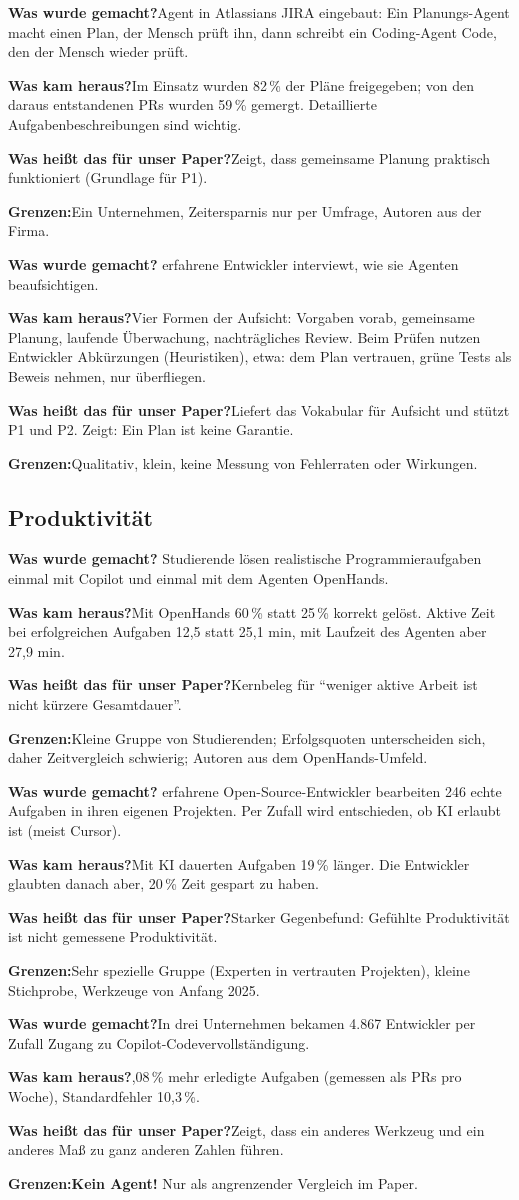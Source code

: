 \documentclass[11pt,a4paper,parskip=half]{scrartcl}
\newcommand{\studie}[6]{%
\begin{tcolorbox}[colback=white,colframe=akzent!50,arc=2pt,boxrule=0.6pt,
  title={\textbf{#1}\hfill\small #2},fonttitle=\color{white},colbacktitle=akzent!80]
\textbf{Was wurde gemacht?}\enskip #3\par
\textbf{Was kam heraus?}\enskip #4\par
\textbf{Was heißt das für unser Paper?}\enskip #5\par
\textbf{Grenzen:}\enskip #6
\end{tcolorbox}}
\begin{document}
\studie{Takerngsaksiri et al. (2025): HULA}{ICSE-SEIP, Atlassian}
{Agent in Atlassians JIRA eingebaut: Ein Planungs-Agent macht einen Plan, der Mensch prüft ihn, dann schreibt ein Coding-Agent Code, den der Mensch wieder prüft.}
{Im Einsatz wurden 82\,\% der Pläne freigegeben; von den daraus entstandenen PRs wurden 59\,\% gemergt. Detaillierte Aufgabenbeschreibungen sind wichtig.}
{Zeigt, dass gemeinsame Planung praktisch funktioniert (Grundlage für P1).}
{Ein Unternehmen, Zeitersparnis nur per Umfrage, Autoren aus der Firma.}

\studie{Dhanorkar et al. (2026): Aufsicht in der Praxis}{arXiv-Preprint, Microsoft}
{17 erfahrene Entwickler interviewt, wie sie Agenten beaufsichtigen.}
{Vier Formen der Aufsicht: Vorgaben vorab, gemeinsame Planung, laufende Überwachung, nachträgliches Review. Beim Prüfen nutzen Entwickler Abkürzungen (Heuristiken), etwa: dem Plan vertrauen, grüne Tests als Beweis nehmen, nur überfliegen.}
{Liefert das Vokabular für Aufsicht und stützt P1 und P2. Zeigt: Ein Plan ist keine Garantie.}
{Qualitativ, klein, keine Messung von Fehlerraten oder Wirkungen.}

\subsection{Produktivität}
\studie{Chen et al. (2026): \enquote{Code with me or for me?}}{CHI '26}
{20 Studierende lösen realistische Programmieraufgaben einmal mit Copilot und einmal mit dem Agenten OpenHands.}
{Mit OpenHands 60\,\% statt 25\,\% korrekt gelöst. Aktive Zeit bei erfolgreichen Aufgaben 12,5 statt 25,1 min, mit Laufzeit des Agenten aber 27,9 min.}
{Kernbeleg für \enquote{weniger aktive Arbeit ist nicht kürzere Gesamtdauer}.}
{Kleine Gruppe von Studierenden; Erfolgsquoten unterscheiden sich, daher Zeitvergleich schwierig; Autoren aus dem OpenHands-Umfeld.}

\studie{Becker et al. (2025): METR-Studie}{arXiv-Preprint}
{16 erfahrene Open-Source-Entwickler bearbeiten 246 echte Aufgaben in ihren eigenen Projekten. Per Zufall wird entschieden, ob KI erlaubt ist (meist Cursor).}
{Mit KI dauerten Aufgaben 19\,\% länger. Die Entwickler glaubten danach aber, 20\,\% Zeit gespart zu haben.}
{Starker Gegenbefund: Gefühlte Produktivität ist nicht gemessene Produktivität.}
{Sehr spezielle Gruppe (Experten in vertrauten Projekten), kleine Stichprobe, Werkzeuge von Anfang 2025.}

\studie{Cui et al. (2026): Drei Feldexperimente}{Management Science}
{In drei Unternehmen bekamen 4.867 Entwickler per Zufall Zugang zu Copilot-Codevervollständigung.}
{26,08\,\% mehr erledigte Aufgaben (gemessen als PRs pro Woche), Standardfehler 10,3\,\%.}
{Zeigt, dass ein anderes Werkzeug und ein anderes Maß zu ganz anderen Zahlen führen.}
{\textbf{Kein Agent!} Nur als angrenzender Vergleich im Paper.}
\end{document}
